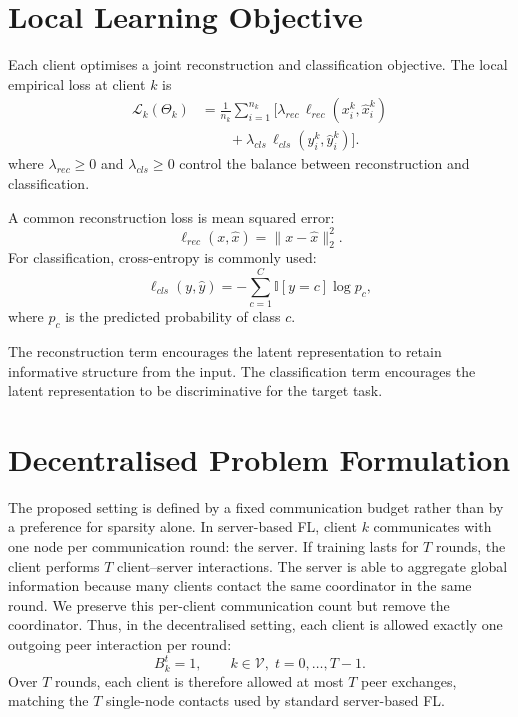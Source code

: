 \documentclass[conference]{IEEEtran}
\begin{document}
\section{Local Learning Objective}
\label{sec:local-learning-objective}

Each client optimises a joint reconstruction and classification objective. The local empirical loss at client \(k\) is
\begin{equation}
\begin{aligned}
\mathcal{L}_k(\Theta_k)
&=\frac{1}{n_k}\sum_{i=1}^{n_k}
\Big[
\lambda_{rec}\,\ell_{rec}(x_i^k,\hat{x}_i^k)\\
&\qquad+\lambda_{cls}\,\ell_{cls}(y_i^k,\hat{y}_i^k)
\Big].
\end{aligned}
\label{eq:local_loss}
\end{equation}
where \(\lambda_{rec}\geq0\) and \(\lambda_{cls}\geq0\) control the balance between reconstruction and classification.

A common reconstruction loss is mean squared error:
\begin{equation}
    \ell_{rec}(x,\hat{x}) = \|x-\hat{x}\|_2^2.
    \label{eq:auto-011}
\end{equation}
For classification, cross-entropy is commonly used:
\begin{equation}
    \ell_{cls}(y,\hat{y}) = -\sum_{c=1}^{C} \mathbb{I}[y=c]\log p_c,
    \label{eq:auto-012}
\end{equation}
where \(p_c\) is the predicted probability of class \(c\).

The reconstruction term encourages the latent representation to retain informative structure from the input. The classification term encourages the latent representation to be discriminative for the target task.

\section{Decentralised Problem Formulation}
\label{sec:decentralised-problem-formulation}

The proposed setting is defined by a fixed communication budget rather than by a preference for sparsity alone. In server-based FL, client $k$ communicates with one node per communication round: the server. If training lasts for $T$ rounds, the client performs $T$ client--server interactions. The server is able to aggregate global information because many clients contact the same coordinator in the same round. We preserve this per-client communication count but remove the coordinator. Thus, in the decentralised setting, each client is allowed exactly one outgoing peer interaction per round:
\begin{equation}
    B_k^t = 1,
    \qquad k\in\mathcal{V},\; t=0,\dots,T-1.
    \label{eq:one_peer_budget}
\end{equation}
Over $T$ rounds, each client is therefore allowed at most $T$ peer exchanges, matching the $T$ single-node contacts used by standard server-based FL.
\end{document}
